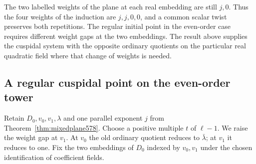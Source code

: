 \documentclass[a4paper,11pt]{article}
\theoremstyle{definition}
\theoremstyle{remark}
\numberwithin{equation}{section}
\begin{document}
The two labelled weights of the plane at each real embedding
are still \(j,0\). Thus the four weights of the induction
are \(j,j,0,0\), and a common scalar twist preserves both
repetitions. The regular initial point in the even-order
case requires different weight gaps at the two embeddings.
The result above supplies the cuspidal system with the
opposite ordinary quotients on the particular real quadratic
field where that change of weights is needed.


\subsection{A regular cuspidal point on the even-order tower}
\label{sec:regularind579}

Retain \(D_0,v_0,v_1,\lambda\) and one parallel exponent \(j\)
from Theorem~\ref{thm:mixedplane578}. Choose a positive multiple
\(t\) of \(\ell-1\). We raise the weight gap at \(v_1\).
At \(v_0\) the old ordinary quotient reduces to
\(\bar\lambda\); at \(v_1\) it reduces to one. Fix the two
embeddings of \(D_0\) indexed by \(v_0,v_1\) under the chosen
identification of coefficient fields.
\end{document}
